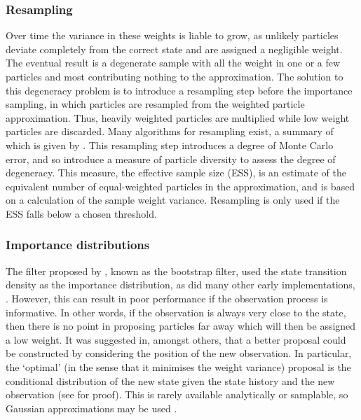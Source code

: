 \subsubsection{Resampling}
Over time the variance in these weights is liable to grow, as unlikely particles deviate completely from the correct state and are assigned a negligible weight. The eventual result is a degenerate sample with all the weight in one or a few particles and most contributing nothing to the approximation. The solution to this degeneracy problem is to introduce a resampling step before the importance sampling, in which particles are resampled from the weighted particle approximation. Thus, heavily weighted particles are multiplied while low weight particles are discarded. Many algorithms for resampling exist, a summary of which is given by \cite{Doucet2009}. This resampling step introduces a degree of Monte Carlo error, and so \cite{Liu1995} introduce a measure of particle diversity to assess the degree of degeneracy. This measure, the effective sample size (ESS), is an estimate of the equivalent number of equal-weighted particles in the approximation, and is based on a calculation of the sample weight variance. Resampling is only used if the ESS falls below a chosen threshold.

\subsubsection{Importance distributions}
The filter proposed by \cite{Gordon1993}, known as the bootstrap filter, used the state transition density as the importance distribution, as did many other early implementations, \cite{Blake1998,Kitagawa1996}. However, this can result in poor performance if the observation process is informative. In other words, if the observation is always very close to the state, then there is no point in proposing particles far away which will then be assigned a low weight. It was suggested in, amongst others, \cite{Liu1995} that a better proposal could be constructed by considering the position of the new observation. In particular, the `optimal' (in the sense that it minimises the weight variance) proposal is the conditional distribution of the new state given the state history and the new observation (see \cite{Doucet2000a} for proof). This is rarely available analytically or samplable, so Gaussian approximations may be used \cite{Doucet2000a}.

